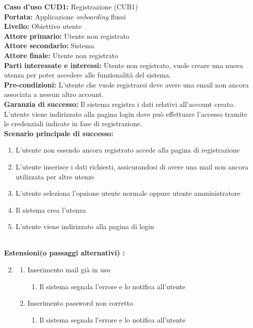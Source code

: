 \textbf{Caso d’uso CUD1:} Registrazione (CUB1) \\
\textbf{Portata:} Applicazione \textit{onboarding} flussi\\
\textbf{Livello:} Obiettivo utente \\
\textbf{Attore primario:} Utente non registrato \\
\textbf{Attore secondario:} Sistema \\
\textbf{Attore finale:} Utente non registrato \\
\textbf{Parti interessate e interessi:}
Utente non registrato, vuole creare una nuova utenza per poter accedere alle funzionalità del sistema.\\
\textbf{Pre-condizioni:} L’utente che vuole registrarsi deve avere una email non ancora associata a
nessun altro account. \\
\textbf{Garanzia di successo:} Il sistema registra i dati relativi all’account creato. L’utente viene
indirizzato alla pagina login dove può effettuare l’accesso tramite le credenziali indicate in fase di registrazione. \\
\textbf{Scenario principale di successo:} 
\begin{enumerate}
  \item L’utente non essendo ancora registrato accede alla pagina di registrazione
  \item L'utente inserisce i dati richiesti, assicurandosi di avere una mail non ancora utilizzata per altre utenze
  \item L'utente seleziona l'opzione utente normale oppure utente amministratore
  \item Il sistema crea l'utenza
  \item L'utente viene indirizzato alla pagina di login 
\end{enumerate} 
\  \\
\textbf{Estensioni(o passaggi alternativi) :}
\begin{enumerate}
 \setcounter{enumi}{1} 
 \item
     \begin{enumerate}
     \item Inserimento mail già in uso
        \begin{enumerate}
            \item Il sistema segnala l’errore e lo notifica all’utente
        \end{enumerate}
     \item Inserimento password non corretto
     \begin{enumerate}
            \item Il sistema segnala l’errore e lo notifica all’utente
        \end{enumerate}
    \end{enumerate}
\end{enumerate}
\clearpage


